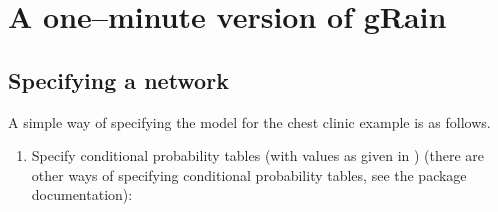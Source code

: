 \documentclass[10pt]{article}\usepackage[]{graphicx}\usepackage[]{xcolor}
\def\grbn{{\bf gRain}}
\begin{document}
\section{A one--minute version of  \grbn{}}
\label{sec:oneminute}

\subsection{Specifying a network}
\label{sec:specifying-network}

A simple way of  specifying the model for the chest clinic
example is as follows.

\begin{enumerate}
\item Specify conditional probability tables (with values as given in
  \cite{lau/spieg:88}) (there are other ways of specifying conditional
  probability tables, see the package documentation):






\end{enumerate}
\end{document}
